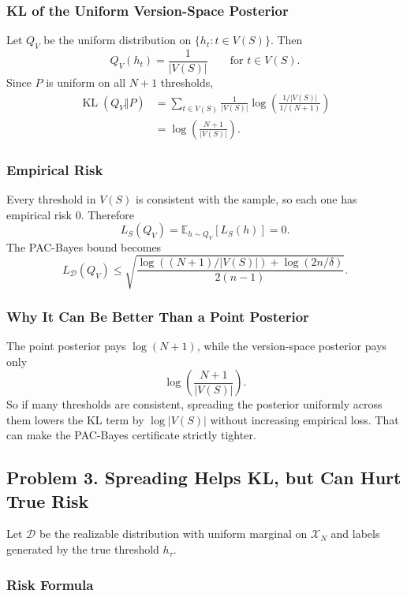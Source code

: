 \documentclass{article}
\DeclareMathOperator{\KL}{KL}
\newcommand{\EE}{\mathbb{E}}
\newcommand{\cD}{\mathcal{D}}
\newcommand{\cX}{\mathcal{X}}
\begin{document}
\subsubsection{KL of the Uniform Version-Space Posterior}

Let $Q_V$ be the uniform distribution on $\{h_t:t\in V(S)\}$. Then
$$
Q_V(h_t)=\frac{1}{|V(S)|}
\qquad
\text{for } t\in V(S).
$$
Since $P$ is uniform on all $N+1$ thresholds,
\begin{align*}
\KL(Q_V\Vert P)
&=
\sum_{t\in V(S)}
\frac{1}{|V(S)|}
\log\!\left(
\frac{1/|V(S)|}{1/(N+1)}
\right) \\
&=
\log\!\left(\frac{N+1}{|V(S)|}\right).
\end{align*}

\subsubsection{Empirical Risk}

Every threshold in $V(S)$ is consistent with the sample, so each one has empirical risk $0$. Therefore
$$
L_S(Q_V)=\EE_{h\sim Q_V}[L_S(h)]=0.
$$
The PAC-Bayes bound becomes
$$
L_{\cD}(Q_V)
\le
\sqrt{
\frac{
\log((N+1)/|V(S)|)+\log(2n/\delta)
}{
2(n-1)
}
}.
$$

\subsubsection{Why It Can Be Better Than a Point Posterior}

The point posterior pays $\log(N+1)$, while the version-space posterior pays only
$$
\log\!\left(\frac{N+1}{|V(S)|}\right).
$$
So if many thresholds are consistent, spreading the posterior uniformly across them lowers the KL term by $\log|V(S)|$ without increasing empirical loss. That can make the PAC-Bayes certificate strictly tighter.

\subsection{Problem 3. Spreading Helps KL, but Can Hurt True Risk}

Let $\cD$ be the realizable distribution with uniform marginal on $\cX_N$ and labels generated by the true threshold $h_\tau$.

\subsubsection{Risk Formula}
\end{document}
